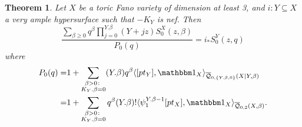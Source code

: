 \documentclass[11pt]{amsart}
\newcommand{\Q}[4]{\overline{\mathcal Q}_{#1,#2}(#3,#4)}
\theoremstyle{plain}
\newtheorem{thm}{Theorem}[section]
\theoremstyle{definition}
\begin{document}
\begin{thm}
Let $X$ be a toric Fano variety of dimension at least 3, and $i\colon Y\subseteq X$ a very ample hypersurface such that $-K_Y$ is nef. Then
\begin{equation}\label{eqn:mirror}
   \frac{\sum_{\beta\geq 0} q^\beta\prod_{j=0}^{Y.\beta}(Y+jz)S_0^X(z,\beta)}{P_0(q)}= i_*S_0^Y(z,q)
\end{equation}
where
\begin{align*}
 P_0(q)= & 1+\sum_{\substack{\beta>0\colon \\ K_Y.\beta=0}} (Y.\beta)q^\beta\langle [pt_Y],\mathbbm 1_{X}\rangle_{\Q{0}{\{Y.\beta,0\}}{X|Y}{\beta}} \\
 = & 1+\sum_{\substack{\beta>0\colon \\ K_Y.\beta=0}} q^\beta(Y.\beta)!\langle\psi_1^{Y.\beta-1}[pt_X],\mathbbm 1_{X}\rangle_{\Q{0}{2}{X}{\beta}}.
\end{align*}
\end{thm}
\end{document}

